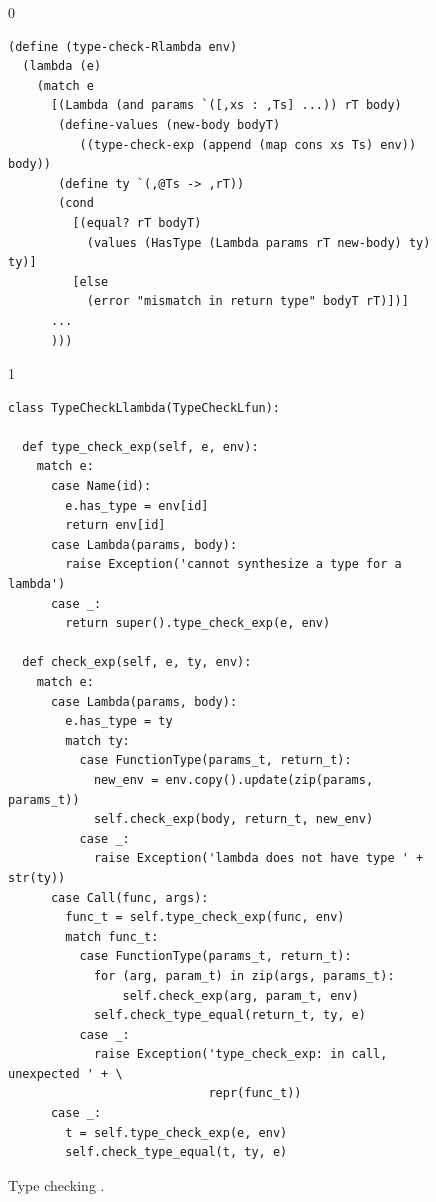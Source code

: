 \documentclass[7x10,nocrop]{TimesAPriori_MIT}%
\def\racketEd{0}
\def\pythonEd{1}
\def\edition{1}
\newcommand{\python}[1]{{\if\edition\pythonEd #1\fi}}
\begin{document}
\begin{figure}[tbp]
{\if\edition\racketEd 
\begin{lstlisting}
(define (type-check-Rlambda env)
  (lambda (e)
    (match e
      [(Lambda (and params `([,xs : ,Ts] ...)) rT body)
       (define-values (new-body bodyT) 
          ((type-check-exp (append (map cons xs Ts) env)) body))
       (define ty `(,@Ts -> ,rT))
       (cond
         [(equal? rT bodyT)
           (values (HasType (Lambda params rT new-body) ty) ty)]
         [else
           (error "mismatch in return type" bodyT rT)])]
      ...
      )))
\end{lstlisting}
\fi}
{\if\edition\pythonEd 
\begin{lstlisting}
class TypeCheckLlambda(TypeCheckLfun):

  def type_check_exp(self, e, env):
    match e:
      case Name(id):
        e.has_type = env[id]
        return env[id]
      case Lambda(params, body):
        raise Exception('cannot synthesize a type for a lambda')
      case _:
        return super().type_check_exp(e, env)
    
  def check_exp(self, e, ty, env):
    match e:
      case Lambda(params, body):
        e.has_type = ty
        match ty:
          case FunctionType(params_t, return_t):
            new_env = env.copy().update(zip(params, params_t))
            self.check_exp(body, return_t, new_env)
          case _:
            raise Exception('lambda does not have type ' + str(ty))
      case Call(func, args):
        func_t = self.type_check_exp(func, env)
        match func_t:
          case FunctionType(params_t, return_t):
            for (arg, param_t) in zip(args, params_t):
                self.check_exp(arg, param_t, env)
            self.check_type_equal(return_t, ty, e)
          case _:
            raise Exception('type_check_exp: in call, unexpected ' + \
                            repr(func_t))
      case _:
        t = self.type_check_exp(e, env)
        self.check_type_equal(t, ty, e)
\end{lstlisting}
\fi}
\caption{Type checking \LangLam{}\python{, part 1}.}
\label{fig:type-check-Llambda}
\end{figure}
\end{document}
